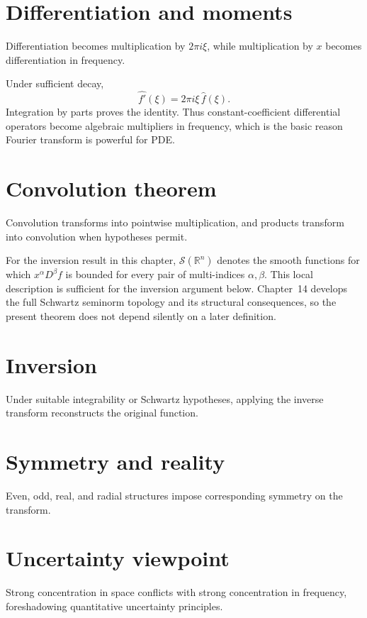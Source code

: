 \section{Differentiation and moments}
Differentiation becomes multiplication by $2\pi i\xi$, while multiplication by $x$ becomes differentiation in frequency.


\begin{example}\label{ex:iii11-expand-03}
Under sufficient decay,
\[
\widehat{f'}(\xi)=2\pi i\xi\,\widehat f(\xi).
\]
Integration by parts proves the identity. Thus constant-coefficient
differential operators become algebraic multipliers in frequency, which is the
basic reason Fourier transform is powerful for PDE.
\end{example}
\section{Convolution theorem}
Convolution transforms into pointwise multiplication, and products transform into convolution when hypotheses permit.

\begin{remark}
For the inversion result in this chapter,
$\mathcal S(\mathbb R^n)$ denotes the smooth functions for which
$x^\alpha D^\beta f$ is bounded for every pair of multi-indices
$\alpha,\beta$.  This local description is sufficient for the inversion
argument below.  Chapter~14 develops the full Schwartz seminorm topology and
its structural consequences, so the present theorem does not depend silently
on a later definition.
\end{remark}

\section{Inversion}
Under suitable integrability or Schwartz hypotheses, applying the inverse transform reconstructs the original function.

\section{Symmetry and reality}
Even, odd, real, and radial structures impose corresponding symmetry on the transform.

\section{Uncertainty viewpoint}
Strong concentration in space conflicts with strong concentration in frequency, foreshadowing quantitative uncertainty principles.


